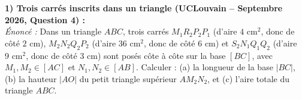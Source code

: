 \begin{exemple}
\textbf{1) Trois carrés inscrits dans un triangle (UCLouvain -- Septembre 2026, Question 4) :}\\
\emph{Énoncé :} Dans un triangle $ABC$, trois carrés $M_1 R_2 P_2 P_1$ (d'aire $4\text{ cm}^2$, donc de côté $2\text{ cm}$), $M_2 N_2 Q_2 P_2$ (d'aire $36\text{ cm}^2$, donc de côté $6\text{ cm}$) et $S_2 N_1 Q_1 Q_2$ (d'aire $9\text{ cm}^2$, donc de côté $3\text{ cm}$) sont posés côte à côte sur la base $[BC]$, avec $M_1, M_2 \in [AC]$ et $N_1, N_2 \in [AB]$. Calculer : (a) la longueur de la base $|BC|$, (b) la hauteur $|AO|$ du petit triangle supérieur $AM_2 N_2$, et (c) l'aire totale du triangle $ABC$.
\begin{center}
\end{center}
\end{exemple}
